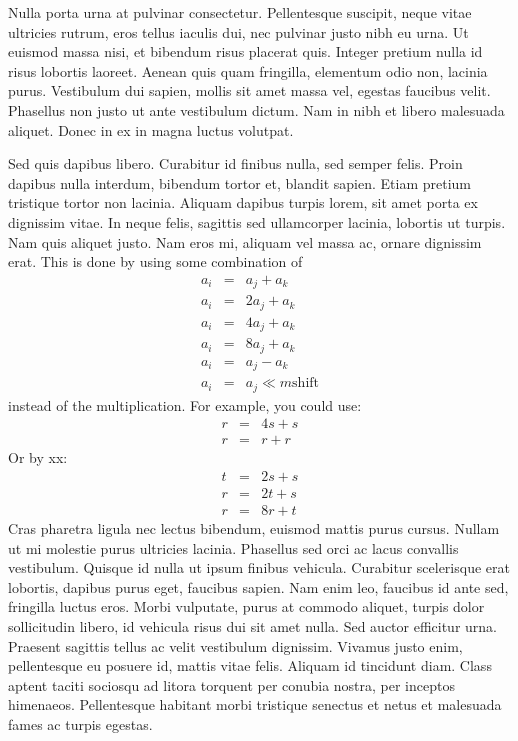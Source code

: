 Nulla porta urna at pulvinar consectetur. Pellentesque suscipit, neque vitae ultricies rutrum, eros tellus iaculis dui, nec pulvinar justo nibh eu urna. Ut euismod massa nisi, et bibendum risus placerat quis. Integer pretium nulla id risus lobortis laoreet. Aenean quis quam fringilla, elementum odio non, lacinia purus. Vestibulum dui sapien, mollis sit amet massa vel, egestas faucibus velit. Phasellus non justo ut ante vestibulum dictum. Nam in nibh et libero malesuada aliquet. Donec in ex in magna luctus volutpat.

Sed quis dapibus libero. Curabitur id finibus nulla, sed semper felis. Proin dapibus nulla interdum, bibendum tortor et, blandit sapien. Etiam pretium tristique tortor non lacinia. Aliquam dapibus turpis lorem, sit amet porta ex dignissim vitae. In neque felis, sagittis sed ullamcorper lacinia, lobortis ut turpis. Nam quis aliquet justo. Nam eros mi, aliquam vel massa ac, ornare dignissim erat.  This is done by using some combination of
\begin{eqnarray*}
a_i & = & a_j + a_k \\
a_i & = & 2a_j + a_k \\
a_i & = & 4a_j + a_k \\
a_i & = & 8a_j + a_k \\
a_i & = & a_j - a_k \\
a_i & = & a_j \ll m \mbox{shift}
\end{eqnarray*}
instead of the multiplication.  For example, you could use:
\begin{eqnarray*}
r & = & 4s + s\\
r & = & r + r
\end{eqnarray*}
Or by xx:
\begin{eqnarray*}
t & = & 2s + s \\
r & = & 2t + s \\
r & = & 8r + t
\end{eqnarray*}
Cras pharetra ligula nec lectus bibendum, euismod mattis purus cursus. Nullam ut mi molestie purus ultricies lacinia. Phasellus sed orci ac lacus convallis vestibulum. Quisque id nulla ut ipsum finibus vehicula. Curabitur scelerisque erat lobortis, dapibus purus eget, faucibus sapien. Nam enim leo, faucibus id ante sed, fringilla luctus eros. Morbi vulputate, purus at commodo aliquet, turpis dolor sollicitudin libero, id vehicula risus dui sit amet nulla. Sed auctor efficitur urna. Praesent sagittis tellus ac velit vestibulum dignissim. Vivamus justo enim, pellentesque eu posuere id, mattis vitae felis. Aliquam id tincidunt diam. Class aptent taciti sociosqu ad litora torquent per conubia nostra, per inceptos himenaeos. Pellentesque habitant morbi tristique senectus et netus et malesuada fames ac turpis egestas.